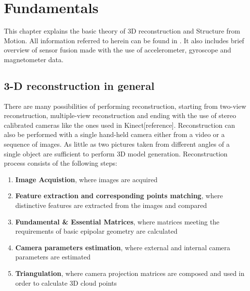 
\chapter{Fundamentals} %
This chapter explains the basic theory of 3D reconstruction and Structure from Motion. All information referred to herein can be found in \cite{HartleyMultipleView}. It also includes brief overview of sensor fusion made with the use of accelerometer, gyroscope and magnetometer data. 

\section{3-D reconstruction in general}
There are many possibilities of performing reconstruction, starting from two-view reconstruction, multiple-view reconstruction and ending with the use of stereo calibrated cameras like the ones used in Kinect[reference]. Reconstruction can also be performed with a single hand-held camera either from a video or a sequence of images. As little as two pictures taken from different angles of a single object are sufficient to perform 3D model generation. Reconstruction process consists of the following steps:
\begin{enumerate}
\item \textbf{Image Acquistion}, where images are acquired 
\item \textbf{Feature extraction and corresponding points matching}, where distinctive features are extracted from the images and compared
\item \textbf{Fundamental \& Essential Matrices}, where matrices meeting the requirements of basic epipolar geometry are calculated
\item \textbf{Camera parameters estimation}, where external and internal camera parameters are estimated
\item \textbf{Triangulation}, where camera projection matrices are composed and used in order to calculate 3D cloud points
\end{enumerate}
